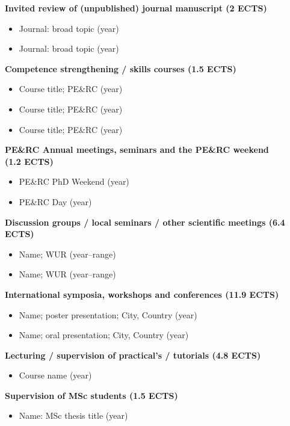 \textbf{Invited review of (unpublished) journal manuscript (2 ECTS)}
\begin{itemize}[nolistsep]
    \item Journal: broad topic (year)
    \item Journal: broad topic (year)
\end{itemize}

\textbf{Competence strengthening / skills courses (1.5 ECTS)}
\begin{itemize}[nolistsep]
    \item Course title; PE\&RC (year)
    \item Course title; PE\&RC (year)
    \item Course title; PE\&RC (year)
\end{itemize}

\textbf{PE\&RC Annual meetings, seminars and the PE\&RC weekend \\ (1.2 ECTS)}
\begin{itemize}[nolistsep]
    \item PE\&RC PhD Weekend (year)
    \item PE\&RC Day (year)
\end{itemize}

\textbf{Discussion groups / local seminars / other scientific meetings (6.4 ECTS)}
\begin{itemize}[nolistsep]
    \item Name; WUR (year--range)
    \item Name; WUR (year--range)
\end{itemize}

\textbf{International symposia, workshops and conferences (11.9 ECTS)}
\begin{itemize}[nolistsep]
    \item Name; poster presentation; City, Country (year)
    \item Name; oral presentation; City, Country (year)
\end{itemize}

\textbf{Lecturing / supervision of practical’s / tutorials (4.8 ECTS)}
\begin{itemize}[nolistsep]
    \item Course name (year)
\end{itemize}

\textbf{Supervision of MSc students (1.5 ECTS)}
\begin{itemize}[nolistsep]
    \item Name: MSc thesis title (year)
\end{itemize}
